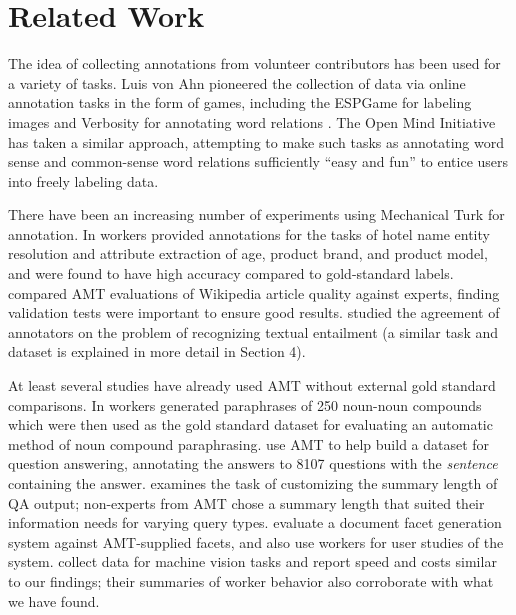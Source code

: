\documentclass[11pt]{article}
\begin{document}

\section{Related Work}

The idea of collecting annotations from volunteer contributors has been used for a variety
of tasks. Luis von Ahn pioneered the collection of data via online
annotation tasks in the form of games, including the ESPGame for
labeling images \cite{espgame} and Verbosity for annotating word
relations \cite{verbosity}.  The Open Mind Initiative \cite{OpenMind}
has taken a similar approach, attempting to make such tasks as
annotating word sense \cite{WordExpert} and common-sense word
relations \cite{OpenMindCommonSense} sufficiently ``easy and fun''
to entice users into freely labeling data.

There have been an increasing number of experiments using Mechanical
Turk for annotation.  In \cite{Su:07} workers provided annotations for the tasks of
hotel name entity resolution and attribute extraction of age, product brand, and
product model, and were found to have high accuracy compared to gold-standard labels.  
 compared AMT evaluations of Wikipedia article quality against experts, finding validation tests were important to ensure good results.
 studied the agreement of annotators
on the problem of recognizing textual entailment (a similar task
and dataset is explained in more detail in Section 4).

At least several studies have already used AMT without external gold standard comparisons.
In \cite{NakovLREC:08} workers generated paraphrases of 250 noun-noun compounds which were then used
as the gold standard dataset for evaluating an automatic method of noun compound paraphrasing.
 use AMT to help build a dataset for question answering, 
annotating the answers to 8107
questions with the \textit{sentence}
containing the answer.  
 examines the task of
customizing the summary length of QA output;
non-experts from AMT chose a summary length that suited their information needs for varying
query types.  
 evaluate a document facet generation system against AMT-supplied facets, and also use workers for user studies of the system.   collect data for machine vision tasks and report speed and costs similar to our findings; their summaries of worker behavior also corroborate with what we have found.
\end{document}
